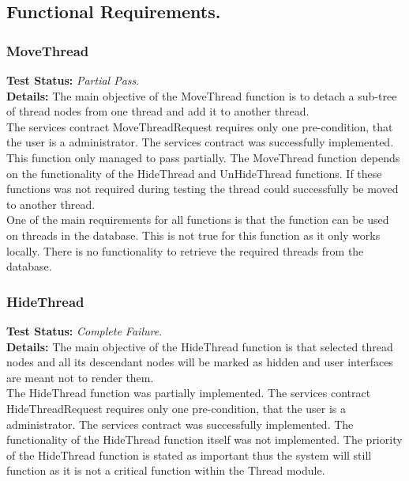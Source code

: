 \subsection{Functional Requirements.}
\begin{flushleft}

\subsubsection{MoveThread}
\begin{flushleft}
	\textbf{Test Status:} \emph{Partial Pass}. \\

	\textbf{Details:}
	The main objective of the MoveThread function is to detach a sub-tree of thread nodes from one thread and add it to another thread.\\
	The services contract MoveThreadRequest requires only one pre-condition, that the user is a administrator.
	The services contract was successfully implemented. This function only managed to pass partially. The MoveThread function depends on the functionality of the HideThread and UnHideThread functions. If these functions was not required during testing the thread could successfully be moved to another thread.\\
	One of the main requirements for all functions is that the function can be used on threads in the database. This is not true for this function as it only works locally. There is no functionality to retrieve the required threads from the database.

\end{flushleft}

\subsubsection{HideThread}
\begin{flushleft}
	\textbf{Test Status:} \emph{Complete Failure}. \\

	\textbf{Details:}
	The main objective of the HideThread function is that selected thread nodes and all	its descendant nodes will be marked as hidden and user interfaces are meant not to render them.\\
	The HideThread function was partially implemented. The services contract HideThreadRequest requires only one pre-condition, that the user is a administrator. The services contract was successfully implemented. The functionality of the HideThread function itself was not implemented. The priority of the HideThread function is stated as important thus the system will still function as it is not a critical function within the Thread module.
  
\end{flushleft}

\end{flushleft}
